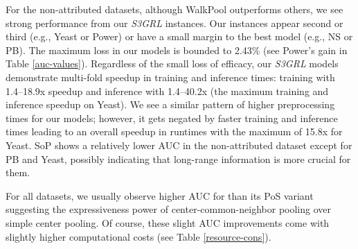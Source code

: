 \documentclass[sigconf, nonacm]{acmart}
\newcommand{\posplus}{\xspace}
\newcommand{\pos}{{P\lowercase{o}S}\xspace}
\newcommand{\sop}{{S\lowercase{o}P}\xspace}
\newcommand{\ssgrl}{\textit{S3GRL}\xspace}
\newcommand{\grA}[1]{#1\textsf{x}}
\begin{document}
For the non-attributed datasets, although WalkPool outperforms others, we see strong performance from our \ssgrl instances. Our instances appear second or third (e.g., Yeast or Power) or have a small margin to the best model (e.g., NS or PB). The maximum loss in our models is bounded to 2.43\% (see Power's gain in Table \ref{auc-values}). Regardless of the small loss of efficacy, our \ssgrl models demonstrate multi-fold speedup in training and inference times: training with \grA{1.4--18.9} speedup and inference with \grA{1.4--40.2} (the maximum training and inference speedup on Yeast). We see a similar pattern of higher preprocessing times for our models; however, it gets negated by faster training and inference times leading to an overall speedup in runtimes with the maximum of \grA{15.8} for Yeast. \sop shows a relatively lower AUC in the non-attributed dataset except for PB and Yeast, possibly indicating that long-range information is more crucial for them.

For all datasets, we usually observe higher AUC for \posplus than its \pos variant suggesting the expressiveness power of center-common-neighbor pooling over simple center pooling. Of course, these slight AUC improvements come with slightly higher computational costs (see Table \ref{resource-cons}). 
\end{document}
